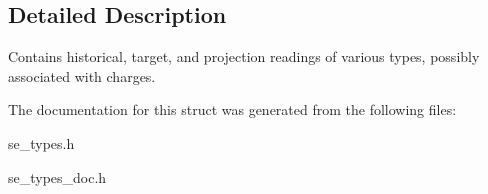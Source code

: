 \subsection{Detailed Description}
Contains historical, target, and projection readings of various types, possibly associated with charges. 

The documentation for this struct was generated from the following files\+:\begin{DoxyCompactItemize}
\item 
se\+\_\+types.\+h\item 
se\+\_\+types\+\_\+doc.\+h\end{DoxyCompactItemize}
